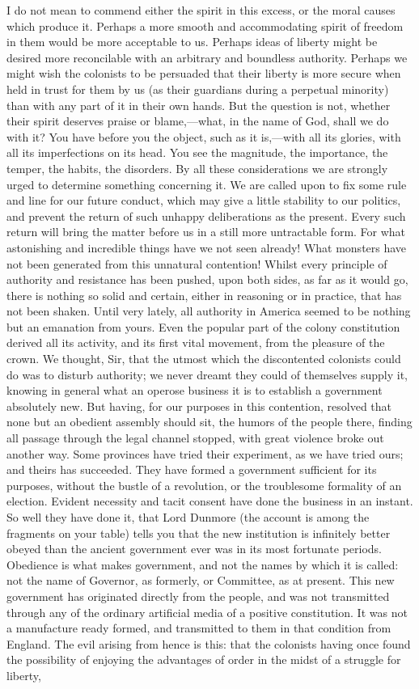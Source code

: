 I do not mean to commend either the spirit in this excess, or the moral causes which produce it. Perhaps a more smooth and accommodating spirit of freedom in them would be more acceptable to us. Perhaps ideas of liberty might be desired more reconcilable with an arbitrary and boundless authority. Perhaps we might wish the colonists to be persuaded that their liberty is more secure when held in trust for them by us (as their guardians during a perpetual minority) than with any part of it in their own hands. But the question is not, whether their spirit deserves praise or blame,—what, in the name of God, shall we do with it? You have before you the object, such as it is,—with all its glories, with all its imperfections on its head. You see the magnitude, the importance, the temper, the habits, the disorders. By all these considerations we are strongly urged to determine something concerning it. We are called upon to fix some rule and line for our future conduct, which may give a little stability to our politics, and prevent the return of such unhappy deliberations as the present. Every such return will bring the matter before us in a still more untractable form. For what astonishing and incredible things have we not seen already! What monsters have not been generated from this unnatural contention! Whilst every principle of authority and resistance has been pushed, upon both sides, as far as it would go, there is nothing so solid and certain, either in reasoning or in practice, that has not been shaken. Until very lately, all authority in America seemed to be nothing but an emanation from yours. Even the popular part of the colony constitution derived all its activity, and its first vital movement, from the pleasure of the crown. We thought, Sir, that the utmost which the discontented colonists could do was to disturb authority; we never dreamt they could of themselves supply it, knowing in general what an operose business it is to establish a government absolutely new. But having, for our purposes in this contention, resolved that none but an obedient assembly should sit, the humors of the people there, finding all passage through the legal channel stopped, with great violence broke out another way. Some provinces have tried their experiment, as we have tried ours; and theirs has succeeded. They have formed a government sufficient for its purposes, without the bustle of a revolution, or the troublesome formality of an election. Evident necessity and tacit consent have done the business in an instant. So well they have done it, that Lord Dunmore (the account is among the fragments on your table) tells you that the new institution is infinitely better obeyed than the ancient government ever was in its most fortunate periods. Obedience is what makes government, and not the names by which it is called: not the name of Governor, as formerly, or Committee, as at present. This new government has originated directly from the people, and was not transmitted through any of the ordinary artificial media of a positive constitution. It was not a manufacture ready formed, and transmitted to them in that condition from England. The evil arising from hence is this: that the colonists having once found the possibility of enjoying the advantages of order in the midst of a struggle for liberty, 